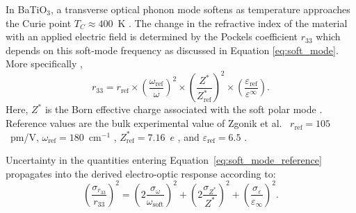 \documentclass[prb,twocolumn,superscriptaddress,amsmath,amssymb,longbibliography]{revtex4-2}
\begin{document}
In BaTiO$_3$, a transverse optical phonon mode softens as temperature approaches the Curie point $T_C \approx 400$~K \cite{Lines2001,Cochran1960,Zhong1994_BTO,Zhong1995}. The change in the refractive index of the material with an applied electric field is determined by the Pockels coefficient $r_{33}$ which depends on this soft-mode frequency as discussed in Equation \ref{eq:soft_mode}. More specifically \cite{Veithen2005},
\begin{equation}
    r_{33} = r_{\mathrm{ref}} \times \left(\frac{\omega_{\mathrm{ref}}}{\omega }\right)^2\times 
\left(\frac{Z^*}{Z^*_{\mathrm{ref}}}\right)^2 \times 
\left(\frac{\varepsilon_{\mathrm{ref}}}{\varepsilon^\infty}\right).
\label{eq:soft_mode_reference}
\end{equation}
Here, $Z^*$ is the Born effective charge associated with the soft polar mode
\cite{Ghosez1998_BEC,Resta1994_BEC,KingSmith1993}. Reference values are the 
bulk experimental value of Zgonik et al.\ \cite{Zgonik1994}
$r_{\mathrm{ref}} = 105$~pm/V, $\omega_{\mathrm{ref}} = 180$~cm$^{-1}$ 
\cite{Lines2001}, $Z^*_{\mathrm{ref}} = 7.16$~$e$ 
\cite{Ghosez1998_BEC}, and $\varepsilon_{\mathrm{ref}} = 6.5$ 
\cite{Ghosez1998_BEC}. 

Uncertainty in the quantities entering Equation~\ref{eq:soft_mode_reference}
propagates into the derived electro-optic response according to:
\begin{equation}
\left(\frac{\sigma_{r_{33}}}{r_{33}}\right)^2
=
\left(2\frac{\sigma_{\omega}}{\omega_{\mathrm{soft}}}\right)^2
+
\left(2\frac{\sigma_{Z^*}}{Z^*}\right)^2
+
\left(\frac{\sigma_{\varepsilon}}{\varepsilon_{\infty}}\right)^2 .
\label{eq:r33_uncertainty}
\end{equation}



\end{document}
